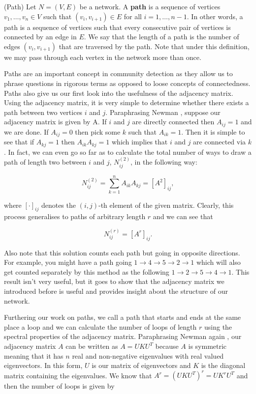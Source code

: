 \begin{definition}{(Path)}
    Let $N = (V, E)$ be a network. A \textbf{path} is a sequence of vertices $v_1, \dots, v_n \in V$ such that $(v_i, v_{i+1}) \in E$ for all $i = 1, \dots, n-1$. In other words, a path is a sequence of vertices such that every consecutive pair of vertices is connected by an edge in $E$. We say that the length of a path is the number of edges $(v_i, v_{i+1})$ that are traversed by the path. Note that under this definition, we may pass through each vertex in the network more than once.
\end{definition}

Paths are an important concept in community detection as they allow us to phrase questions in rigorous terms as opposed to loose concepts of connectedness. Paths also give us our first look into the usefulness of the adjacency matrix. Using the adjacency matrix, it is very simple to determine whether there exists a path between two vertices $i$ and $j$. Paraphrasing Newman \cite[137]{newman10}, suppose our adjacency matrix is given by A. If $i$ and $j$ are directly connected then $A_{ij} = 1$ and we are done. If $A_{ij} = 0$ then pick some $k$ such that $A_{ik} = 1$. Then it is simple to see that if $A_{kj} = 1$ then $A_{ik}A_{kj} = 1$ which implies that $i$ and $j$ are connected via $k$. In fact, we can even go so far as to calculate the total number of ways to draw a path of length two between $i$ and $j$, $N^{(2)}_{ij}$, in the following way:

$$
N_{ij}^{(2)} = \sum_{k=1}^n A_{ik}A_{kj} = [A^2]_{ij},
$$

\noindent
where $[\cdot]_{ij}$ denotes the $(i, j)$-th element of the given matrix. Clearly, this process generalises to paths of arbitrary length $r$ and we can see that

$$
N_{ij}^{(r)} = [A^r]_{ij}.
$$

\noindent
Also note that this solution counts each path but going in opposite directions. For example, you might have a path going $1 \rightarrow 4 \rightarrow 5 \rightarrow 2 \rightarrow 1$ which will also get counted separately by this method as the following $1 \rightarrow 2 \rightarrow 5 \rightarrow 4 \rightarrow 1$. This result isn't very useful, but it goes to show that the adjacency matrix we introduced before is useful and provides insight about the structure of our network. 

Furthering our work on paths, we call a path that starts and ends at the same place a loop and we can calculate the number of loops of length $r$ using the spectral properties of the adjacency matrix. Paraphrasing Newman again \cite[137]{newman10}, our adjacency matrix $A$ can be written as $A = UKU^T$ because $A$ is symmetric meaning that it has $n$ real and non-negative eigenvalues with real valued eigenvectors. In this form, $U$ is our matrix of eigenvectors and $K$ is the diagonal matrix containing the eigenvalues. We know that $A^r = (UKU^T)^r = UK^rU^T$ and then the number of loops is given by


